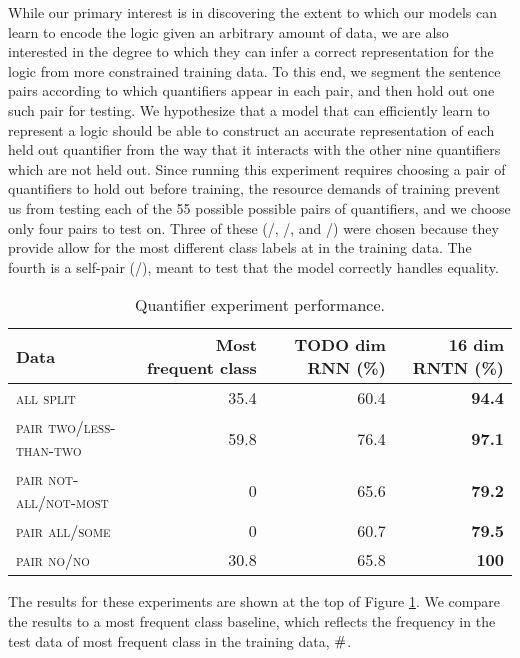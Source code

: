 While our primary interest is in discovering the extent to which our
models can learn to encode the logic given an arbitrary amount of
data, we are also interested in the degree to which they can infer a
correct representation for the logic from more constrained training
data. To this end, we segment the sentence pairs according to which
quantifiers appear in each pair, and then hold out one such pair for
testing. We hypothesize that a model that can efficiently learn to
represent a logic should be able to construct an accurate
representation of each held out quantifier from the way that it
interacts with the other nine quantifiers which are not held
out. Since running this experiment requires choosing a pair of
quantifiers to hold out before training, the resource demands of
training prevent us from testing each of the 55 possible possible
pairs of quantifiers, and we choose only four pairs to test on.  Three
of these (/, /, and
/) were chosen because they provide allow for the most
different class labels at in the training data. The fourth is a
self-pair (/), meant to test that the model correctly
handles equality.


\begin{table}[htp]
  \centering
  \begin{tabular}{ l rrr }
    \toprule
    Data & Most frequent class & TODO dim RNN (\%) & 16 dim RNTN (\%)\\
    \midrule
    \textsc{all split}	& 35.4 &	60.4&	\textbf{94.4}
    \\[1ex]    
    \textsc{pair two/less-than-two}	& 59.8 &	76.4 &	\textbf{97.1} \\
    \textsc{pair not-all/not-most}	&0 &	   65.6  &	\textbf{79.2} \\
    \textsc{pair all/some}	& 0& 60.7  &	\textbf{79.5} \\
    \textsc{pair no/no}	& 30.8 &	65.8 &	\textbf{100} \\
    \bottomrule
  \end{tabular}
  \caption{Quantifier experiment performance. }
  \label{resultstable}
\end{table} 


The results for these experiments are shown at the top of Figure \ref{resultstable}. We compare the results to a most frequent class baseline, which reflects the frequency in the test data of most frequent class in the training data, $\mathbin{\#}$.


